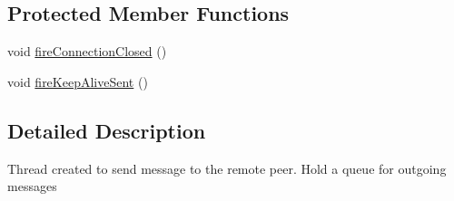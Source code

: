 \subsection*{Protected Member Functions}
\begin{DoxyCompactItemize}
\item 
void \hyperlink{classj_bittorrent_a_p_i_1_1_message_sender_a3323d46a5bd9b37824f3cdff188baf17}{fireConnectionClosed} ()
\item 
void \hyperlink{classj_bittorrent_a_p_i_1_1_message_sender_a21a7fc624fa156b056028a36bbf136f8}{fireKeepAliveSent} ()
\end{DoxyCompactItemize}


\subsection{Detailed Description}
Thread created to send message to the remote peer. Hold a queue for outgoing messages 


